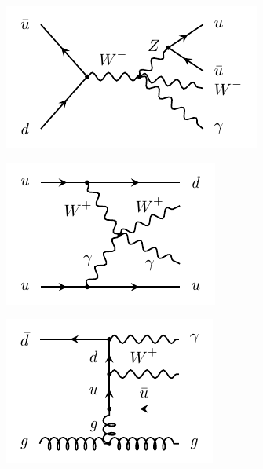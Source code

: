 \begin{figure}[t]
\begin{subfigure}[b]{0.32\textwidth}
    \caption{}
\end{subfigure}
\hfill
\begin{subfigure}[b]{0.32\textwidth}
    \centering
    \includegraphics[width=\textwidth]{plots/diffx/vbswgEW5-1.pdf}
    \caption{}
\end{subfigure}
\hfill
\begin{subfigure}[b]{0.32\textwidth}
    \centering
    \includegraphics[width=\textwidth]{plots/diffx/vbswgEW3.pdf}
    \caption{}
\end{subfigure}
\hfill
\begin{subfigure}[b]{0.32\textwidth}
    \centering
    \includegraphics[width=\textwidth]{plots/diffx/vbswgQcd.pdf}

\end{subfigure}
\end{figure}
